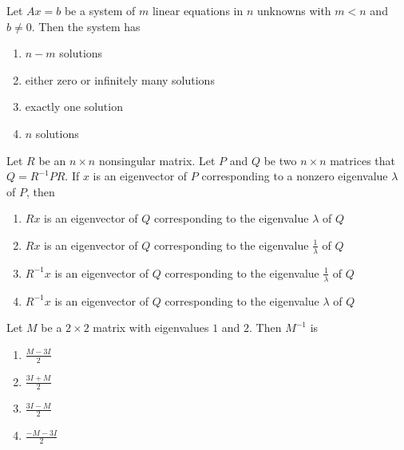 \iffalse
\chapter{2007}
\author{EE24BTECH11021 - Eshan Ray}
\section{xe}
\fi
    \item Let $Ax=b$ be a system of $m$ linear equations in $n$ unknowns with $m<n$ and $b\neq0$. Then the system has
        \begin{enumerate}
            \item $n-m$ solutions
            \item either zero or infinitely many solutions
            \item exactly one solution
            \item $n$ solutions
        \end{enumerate}


    \item Let $R$ be an $n\times n$ nonsingular matrix. Let $P$ and $Q$ be two $n\times n$ matrices that $Q=R^{-1}PR$. If $x$ is an eigenvector of $P$ corresponding to a nonzero eigenvalue $\lambda$ of $P$, then
        \begin{enumerate}
            \item $Rx$ is an eigenvector of $Q$ corresponding to the eigenvalue $\lambda$ of $Q$
            \item $Rx$ is an eigenvector of $Q$ corresponding to the eigenvalue $\frac{1}{\lambda}$ of $Q$
            \item $R^{-1}x$ is an eigenvector of $Q$ corresponding to the eigenvalue $\frac{1}{\lambda}$ of $Q$
            \item $R^{-1}x$ is an eigenvector of $Q$ corresponding to the eigenvalue $\lambda$ of $Q$
        \end{enumerate}


    \item Let $M$ be a $2\times 2$ matrix with eigenvalues $1$ and $2$. Then $M^{-1}$ is
        \begin{enumerate}
            \item $\frac{M-3I}{2}$
            \item $\frac{3I+M}{2}$
            \item $\frac{3I-M}{2}$
            \item $\frac{-M-3I}{2}$
        \end{enumerate}

